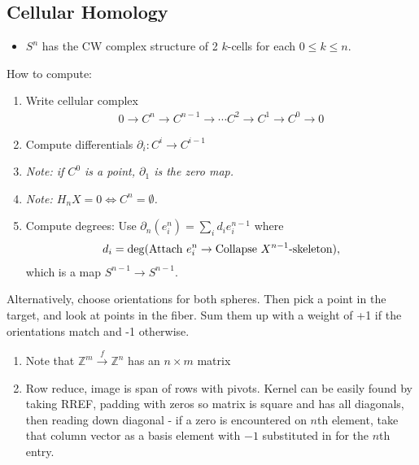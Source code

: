\hypertarget{cellular-homology}{%
\subsection{Cellular Homology}\label{cellular-homology}}

\begin{itemize}
\tightlist
\item
  \(S^n\) has the CW complex structure of 2 \(k\)-cells for each
  \(0\leq k \leq n\).
\end{itemize}

How to compute:

\begin{enumerate}
\def\labelenumi{\arabic{enumi}.}
\item
  Write cellular complex
  \begin{align*}0 \to C^n \to C^{n-1} \to \cdots C^2 \to C^1 \to C^0 \to 0\end{align*}
\item
  Compute differentials \({\partial}_{i}: C^i \to C^{i-1}\)
\item
  \emph{Note: if \(C^0\) is a point, \({\partial}_{1}\) is the zero
  map.}
\item
  \emph{Note: \(H_{n} X = 0 \iff C^n = \emptyset\).}
\item
  Compute degrees: Use
  \({\partial}_{n}(e_{i}^n) = \sum_{i} d_{i} e_{i}^{n-1}\) where
  \begin{align*}d_{i} = \deg(\text{Attach }e_{i}^n \to \text{Collapse } X^{n-1}{\hbox{-}}\text{skeleton}),\end{align*}
  which is a map \(S^{n-1} \to S^{n-1}\).
\end{enumerate}

Alternatively, choose orientations for both spheres. Then pick a point
in the target, and look at points in the fiber. Sum them up with a
weight of +1 if the orientations match and -1 otherwise.

\begin{enumerate}
\def\labelenumi{\arabic{enumi}.}
\setcounter{enumi}{5}
\item
  Note that \({\mathbb{Z}}^m \xrightarrow{f} {\mathbb{Z}}^n\) has an
  \(n\times m\) matrix
\item
  Row reduce, image is span of rows with pivots. Kernel can be easily
  found by taking RREF, padding with zeros so matrix is square and has
  all diagonals, then reading down diagonal - if a zero is encountered
  on \(n\)th element, take that column vector as a basis element with
  \(-1\) substituted in for the \(n\)th entry.
\end{enumerate}

